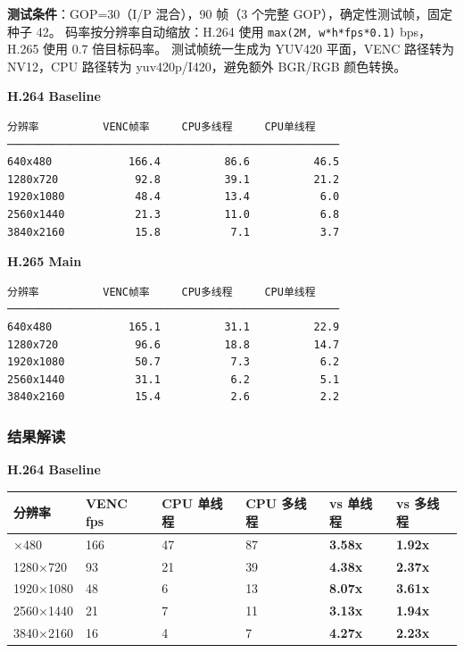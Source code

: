 \textbf{测试条件}：GOP=30（I/P 混合），90 帧（3 个完整
GOP），确定性测试帧，固定种子 42。 码率按分辨率自动缩放：H.264 使用
\passthrough{\lstinline!max(2M, w*h*fps*0.1)!} bps，H.265 使用 0.7
倍目标码率。 测试帧统一生成为 YUV420 平面，VENC 路径转为 NV12，CPU
路径转为 yuv420p/I420，避免额外 BGR/RGB 颜色转换。

\textbf{H.264 Baseline}

\begin{lstlisting}
分辨率          VENC帧率     CPU多线程     CPU单线程
────────────────────────────────────────────────────
640x480            166.4          86.6          46.5
1280x720            92.8          39.1          21.2
1920x1080           48.4          13.4           6.0
2560x1440           21.3          11.0           6.8
3840x2160           15.8           7.1           3.7
\end{lstlisting}

\textbf{H.265 Main}

\begin{lstlisting}
分辨率          VENC帧率     CPU多线程     CPU单线程
────────────────────────────────────────────────────
640x480            165.1          31.1          22.9
1280x720            96.6          18.8          14.7
1920x1080           50.7           7.3           6.2
2560x1440           31.1           6.2           5.1
3840x2160           15.4           2.6           2.2
\end{lstlisting}

\subsubsection{结果解读}\label{src-book-chapter6-h44}

\textbf{H.264 Baseline}

\begin{longtable}[]{@{}llllll@{}}
\toprule\noalign{}
分辨率 & VENC fps & CPU 单线程 & CPU 多线程 & vs 单线程 & vs 多线程 \\
\midrule\noalign{}
\endhead
\bottomrule\noalign{}
\endlastfoot
640×480 & 166 & 47 & 87 & \textbf{3.58x} & \textbf{1.92x} \\
1280×720 & 93 & 21 & 39 & \textbf{4.38x} & \textbf{2.37x} \\
1920×1080 & 48 & 6 & 13 & \textbf{8.07x} & \textbf{3.61x} \\
2560×1440 & 21 & 7 & 11 & \textbf{3.13x} & \textbf{1.94x} \\
3840×2160 & 16 & 4 & 7 & \textbf{4.27x} & \textbf{2.23x} \\
\end{longtable}

